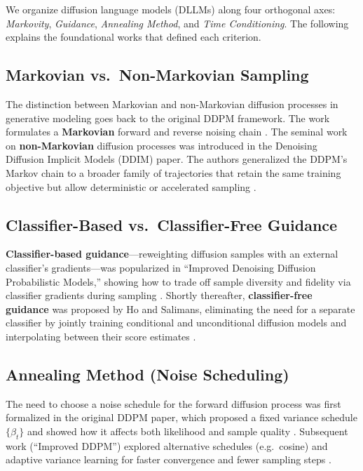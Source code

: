 We organize diffusion language models (DLLMs) along four orthogonal axes: \emph{Markovity}, \emph{Guidance}, \emph{Annealing Method}, and \emph{Time Conditioning}.  The following explains the foundational works that defined each criterion.

\subsection{Markovian vs.~Non-Markovian Sampling}
The distinction between Markovian and non-Markovian diffusion processes in generative modeling goes back to the original DDPM framework. The work formulates a \textbf{Markovian} forward and reverse noising chain \cite{sohl-dickstein_deep_2015}. The seminal work on \textbf{non-Markovian} diffusion processes was introduced in the Denoising Diffusion Implicit Models (DDIM) paper. The authors generalized the DDPM’s Markov chain to a broader family of trajectories that retain the same training objective but allow deterministic or accelerated sampling \cite{song_denoising_2020}.

\subsection{Classifier-Based vs.~Classifier-Free Guidance}
\textbf{Classifier-based guidance}—reweighting diffusion samples with an external classifier’s gradients—was popularized in “Improved Denoising Diffusion Probabilistic Models,” showing how to trade off sample diversity and fidelity via classifier gradients during sampling \cite{nichol_improved_2021}.  Shortly thereafter, \textbf{classifier-free guidance} was proposed by Ho and Salimans, eliminating the need for a separate classifier by jointly training conditional and unconditional diffusion models and interpolating between their score estimates \cite{ho_classifier-free_2022}.


\subsection{Annealing Method (Noise Scheduling)}
The need to choose a noise schedule for the forward diffusion process was first formalized in the original DDPM paper, which proposed a fixed variance schedule $\{\beta_t\}$ and showed how it affects both likelihood and sample quality \cite{ho_denoising_2020}. Subsequent work (“Improved DDPM”) explored alternative schedules (e.g.\ cosine) and adaptive variance learning for faster convergence and fewer sampling steps \cite{nichol_improved_2021}.

